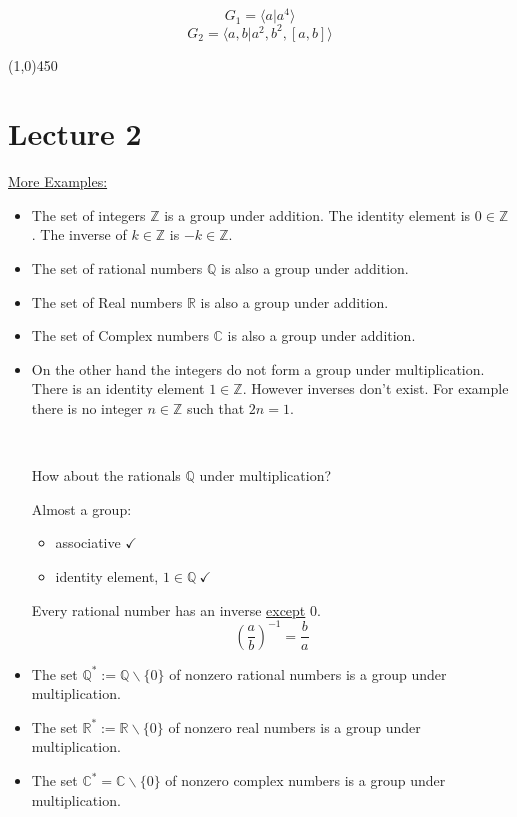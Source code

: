 \documentclass{article}
\theoremstyle{definition}
\begin{document}
$$G_1=\langle a|a^4\rangle$$
$$G_2=\langle a,b|a^2,b^2,[a,b]\rangle$$

\begin{center}
	\line(1,0){450}
\end{center}

\section*{Lecture 2}

\noindent\underline{More Examples:}
\begin{itemize}
    \item The set of integers $\mathbb{Z}$ is a group under addition. The identity element is $0\in\mathbb{Z}$. The inverse of $k\in\mathbb{Z}$ is $-k\in\mathbb{Z}$.
    \item The set of rational numbers $\mathbb{Q}$ is also a group under addition.
    \item The set of Real numbers $\mathbb{R}$ is also a group under addition.
    \item The set of Complex numbers $\mathbb{C}$ is also a group under addition.
    \item On the other hand the integers do not form a group under multiplication. There is an identity element $1\in\mathbb{Z}$. However inverses don't exist. For example there is no integer $n\in\mathbb{Z}$ such that $2n=1$.
    
    \ 

    How about the rationals $\mathbb{Q}$ under multiplication?
    \ 

    Almost a group: \begin{itemize}
        \item associative $\checkmark$
        \item identity element, $1\in\mathbb{Q} \ \checkmark$ 
    \end{itemize}
    Every rational number has an inverse \underline{except} 0.
    $$\left(\frac{a}{b}\right)^{-1}=\frac{b}{a}$$
    \item The set $\mathbb{Q}^*:=\mathbb{Q}\backslash \{0\}$ of nonzero rational numbers is a group under multiplication.
    \item The set $\mathbb{R}^*:=\mathbb{R}\backslash\{0\}$ of nonzero real numbers is a group under multiplication.
    \item The set $\mathbb{C}^*=\mathbb{C}\backslash\{0\}$ of nonzero complex numbers is a group under multiplication.
\end{itemize}
\end{document}
